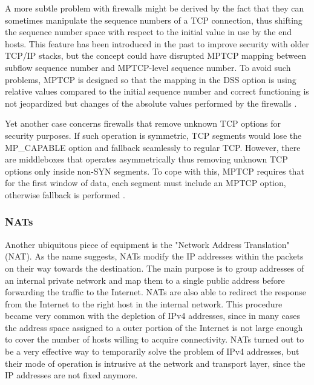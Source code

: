 A more subtle problem with firewalls might be derived by the fact that they can sometimes manipulate the sequence numbers of a TCP connection, thus shifting the sequence number space with respect to the initial value in use by the end hosts. This feature has been introduced in the past to improve security with older TCP/IP stacks, but the concept could have disrupted MPTCP mapping between subflow sequence number and MPTCP-level sequence number. To avoid such problems, MPTCP is designed so that the mapping in the DSS option is using relative values compared to the initial sequence number and correct functioning is not jeopardized but changes of the absolute values performed by the firewalls \cite{2014:2578508}.

Yet another case concerns firewalls that remove unknown TCP options for security purposes. If such operation is symmetric, TCP segments would lose the MP\_CAPABLE option and fallback seamlessly to regular TCP. However, there are middleboxes that operates asymmetrically thus removing unknown TCP options only inside non-SYN segments. To cope with this, MPTCP requires that for the first window of data, each segment must include an MPTCP option, otherwise fallback is performed \cite{HDPDB13}.

\subsubsection{NATs}
Another ubiquitous piece of equipment is the "Network Address Translation" (NAT). As the name suggests, NATs modify the IP addresses within the packets on their way towards the destination. The main purpose is to group addresses of an internal private network and map them to a single public address before forwarding the traffic to the Internet. NATs are also able to redirect the response from the Internet to the right host in the internal network.
This procedure became very common with the depletion of IPv4 addresses, since in many cases the address space assigned to a outer portion of the Internet is not large enough to cover the number of hosts willing to acquire connectivity.
NATs turned out to be a very effective way to temporarily solve the problem of IPv4 addresses, but their mode of operation is intrusive at the network and transport layer, since the IP addresses are not fixed anymore.

